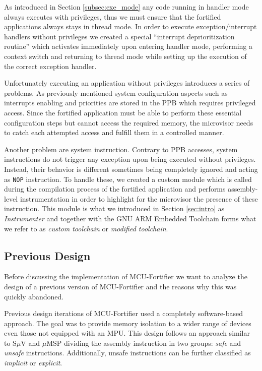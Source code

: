 \documentclass{article}
\begin{document}
As introduced in Section \ref{subsec:exe_mode} any code running in handler mode always executes with privileges, thus we must ensure that the fortified applications always stays in thread mode. In order to execute exception/interrupt handlers without privileges we created a special ``interrupt deprioritization routine'' which activates immediately upon entering handler mode, performing a context switch and returning to thread mode while setting up the execution of the correct exception handler.

Unfortunately executing an application without privileges introduces a series of problems. As previously mentioned system configuration aspects such as interrupts enabling and priorities are stored in the PPB which requires privileged access. 
Since the fortified application must be able to perform these essential configuration steps but cannot access the required memory, the microvisor needs to catch each attempted access and fulfill them in a controlled manner.

Another problem are system instruction. Contrary to PPB accesses, system instructions do not trigger any exception upon being executed without privileges. Instead, their behavior is different sometimes being completely ignored and acting as \verb*|NOP| instruction. To handle these, we created a custom module which is called during the compilation process of the fortified application and performs assembly-level instrumentation in order to highlight for the microvisor the presence of these instruction. This module is what we introduced in Section \ref{sec:intro} as \textit{Instrumenter} and together with the GNU ARM Embedded Toolchain forms what we refer to as \textit{custom toolchain} or \textit{modified toolchain}.

\subsection{Previous Design}
Before discussing the implementation of MCU-Fortifier we want to analyze the design of a previous version of MCU-Fortifier and the reasons why this was quickly abandoned.

Previous design iterations of MCU-Fortifier used a completely software-based approach. The goal was to provide memory isolation to a wider range of devices even those not equipped with an MPU. This design follows an approach similar to S$\mu$V\cite{suv} and $\mu$MSP\cite{msp} dividing the assembly instruction in two groups: \textit{safe} and \textit{unsafe} instructions.
Additionally, unsafe instructions can be further classified as \textit{implicit} or \textit{explicit}.
\end{document}

